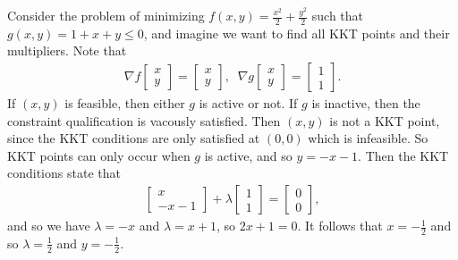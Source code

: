 \begin{exmp}
    Consider the problem of minimizing $f(x, y) = \frac{x^2}{2} + \frac{y^2}{2}$ such that $g(x, y) = 1 + x + y \leq 0$, and imagine we want to find all KKT points and their multipliers. Note that
    \begin{align*}
        \nabla f\begin{bmatrix}
            x \\ y
        \end{bmatrix} = \begin{bmatrix}
            x \\ y
        \end{bmatrix},\;\;
        \nabla g\begin{bmatrix}
            x \\ y
        \end{bmatrix} = \begin{bmatrix}
            1 \\ 1
        \end{bmatrix}.
    \end{align*}
    If $(x, y)$ is feasible, then either $g$ is active or not. If $g$ is inactive, then the constraint qualification is vacously satisfied. Then $(x, y)$ is not a KKT point, since the KKT conditions are only satisfied at $(0, 0)$ which is infeasible. So KKT points can only occur when $g$ is active, and so $y = -x - 1$. Then the KKT conditions state that
    \begin{align*}
        \begin{bmatrix}
            x \\ -x - 1
        \end{bmatrix} + \lambda\begin{bmatrix}
            1 \\ 1
        \end{bmatrix} = \begin{bmatrix}
            0 \\ 0
        \end{bmatrix},
    \end{align*}
    and so we have $\lambda = -x$ and $\lambda = x + 1$, so $2x + 1 = 0$. It follows that $x = -\frac{1}{2}$ and so $\lambda = \frac{1}{2}$ and $y = -\frac{1}{2}$.
\end{exmp}

